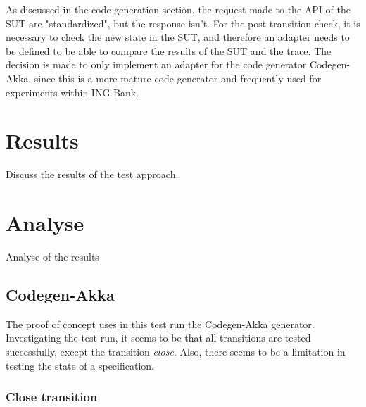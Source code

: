 As discussed in the code generation section, the request made to the API of the
SUT are "standardized", but the response isn't. For the post-transition check,
it is necessary to check the new state in the SUT, and therefore an adapter
needs to be defined to be able to compare the results of the SUT and the trace.
The decision is made to only implement an adapter for the code generator
Codegen-Akka, since this is a more mature code generator and frequently used for
experiments within ING Bank.



\section{Results}
Discuss the results of the test approach.

\section{Analyse}
Analyse of the results

\subsection{Codegen-Akka}
The proof of concept uses in this test run the Codegen-Akka generator.
Investigating the test run, it seems to be that all transitions are tested
successfully, except the transition \textit{close}. Also, there seems to be a
limitation in testing the state of a specification.

\subsubsection{Close transition}
\label{sec:close-no-test-codegenakka}

